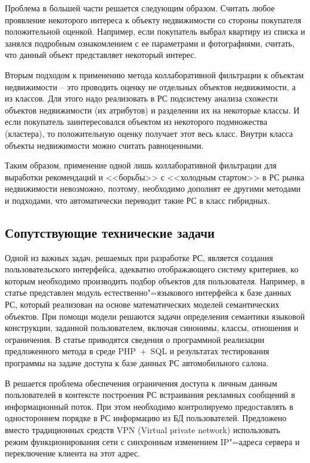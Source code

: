 \documentclass[a4paper,14pt,openany,final]{extreport} %
\begin{document}
Проблема в большей части решается следующим образом. Считать любое проявление некоторого интереса к объекту недвижимости со стороны покупателя положительной оценкой. Например, если покупатель выбрал квартиру из списка и занялся подробным ознакомлением с ее параметрами и фотографиями, считать, что данный объект представляет некоторый интерес.

Вторым подходом к применению метода коллаборативной фильтрации к объектам недвижимости -- это проводить оценку не отдельных объектов недвижимости, а из классов.  Для этого надо реализовать в РС подсистему анализа схожести объектов недвижимости (их атрибутов) и разделении их на некоторые классы. И если покупатель заинтересовался объектом из некоторого подмножества (кластера), то положительную оценку получает этот весь класс. Внутри класса объекты недвижимости можно считать равноценными.

Таким образом, применение одной лишь коллаборативной фильтрации для выработки рекомендаций и <<борьбы>> с <<холодным стартом>> в РС рынка недвижимости невозможно, поэтому, необходимо дополнят ее другими методами и подходами, что автоматически переводит такие РС в класс гибридных.

\subsection{Сопутствующие технические задачи}
\label{sec:co-tasks}

Одной из важных задач, решаемых при разработке РС, является создания пользовательского интерфейса, адекватно отображающего систему критериев, ко которым необходимо производить подбор объектов для пользователя. Например, в статье \cite{b14} представлен модуль естественно"=языкового интерфейса к базе данных РС, который реализован на основе математических моделей семантических объектов. При помощи модели решаются задачи определения семантики языковой конструкции, заданной пользователем, включая синонимы, классы, отношения и ограничения. В статье приводятся сведения о программной реализации предложенного метода в среде PHP~+~SQL и результатах тестирования программы на задаче доступа к базе данных РС автомобильного салона.

В \cite{b15} решается проблема обеспечения ограничения доступа к личным данным пользователей в контексте построения РС встраивания рекламных сообщений в информационный поток. При этом необходимо контролируемо предоставлять в одностороннем порядке в РС информацию из БД пользователей. Предложено вместо традиционных средств VPN (\foreignlanguage{english}{Virtual private network}) использовать режим функционирования сети с синхронным изменением IP"=адреса сервера и переключение клиента на этот адрес.
\end{document}
